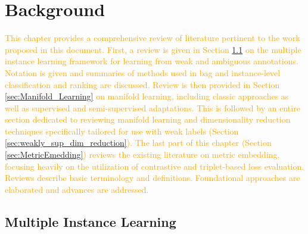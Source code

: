 \chapter{Background}

\textcolor{orange}{This chapter provides a comprehensive review of literature pertinent to the work proposed in this document.  First, a review is given in Section \ref{sec:Multiple_Instance_Learning} on the multiple instance learning framework for learning from weak and ambiguous annotations.  Notation is given and summaries of methods used in bag and instance-level classification and ranking are discussed.  Review is then provided in Section \ref{sec:Manifold_Learning} on manifold learning, including classic approaches as well as supervised and semi-supervised adaptations.  This is followed by an entire section dedicated to reviewing manifold learning and dimensionality reduction techniques specifically tailored for use with weak labels (Section \ref{sec:weakly_sup_dim_reduction}).  The last part of this chapter (Section \ref{sec:MetricEmedding}) reviews the existing literature on metric embedding, focusing heavily on the utilization of contrastive and triplet-based loss evaluation.  Reviews describe basic terminology and definitions.  Foundational approaches are elaborated and advances are addressed.}

\section{Multiple Instance Learning} \label{sec:Multiple_Instance_Learning}

